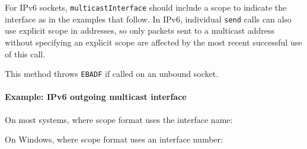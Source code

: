 For IPv6 sockets, \texttt{multicastInterface} should include a scope to
indicate the interface as in the examples that follow. In IPv6,
individual \texttt{send} calls can also use explicit scope in addresses,
so only packets sent to a multicast address without specifying an
explicit scope are affected by the most recent successful use of this
call.

This method throws \texttt{EBADF} if called on an unbound socket.

\paragraph{Example: IPv6 outgoing multicast
interface}\label{example-ipv6-outgoing-multicast-interface}

On most systems, where scope format uses the interface name:

\begin{Shaded}
\begin{Highlighting}[]
\OperatorTok{=}\NormalTok{(}\NormalTok{)}\OperatorTok{;}

\NormalTok{(}\OperatorTok{,}\NormalTok{ () }\KeywordTok{=\textgreater{}}\NormalTok{ \{}
\NormalTok{(}\NormalTok{)}\OperatorTok{;}
\NormalTok{\})}\OperatorTok{;}
\end{Highlighting}
\end{Shaded}

On Windows, where scope format uses an interface number:

\begin{Shaded}
\begin{Highlighting}[]
\OperatorTok{=}\NormalTok{(}\NormalTok{)}\OperatorTok{;}

\NormalTok{(}\OperatorTok{,}\NormalTok{ () }\KeywordTok{=\textgreater{}}\NormalTok{ \{}
\NormalTok{(}\StringTok{\textquotesingle{}::\%2\textquotesingle{}}\NormalTok{)}\OperatorTok{;}
\NormalTok{\})}\OperatorTok{;}
\end{Highlighting}
\end{Shaded}

